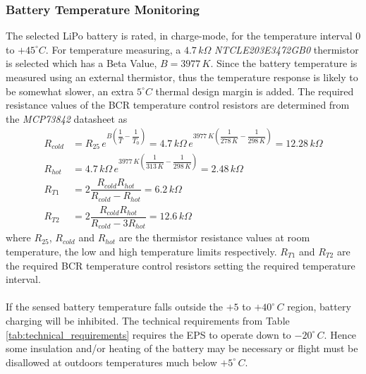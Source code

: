 \subsubsection{Battery Temperature Monitoring}
The selected \ac{LiPo} battery is rated, in charge-mode, for the temperature interval $0$ to $+45^{\circ}C$. For temperature measuring, a $4.7\,k \Omega$ \textit{NTCLE203E3472GB0} thermistor is selected which has a Beta Value, $B=3977\,K$. Since the battery temperature is measured using an external thermistor, thus the temperature response is likely to be somewhat slower, an extra $5^{\circ}C$ thermal design margin is added. The required resistance values of the \ac{BCR} temperature control resistors are determined from the \textit{MCP73842} datasheet as 
%
\begin{equation}
\begin{split}
R_{cold}&=R_{25}\,e^{B(\dfrac{1}{T}-\dfrac{1}{T_0})}=4.7\,k\Omega \,e^{3977\,K(\dfrac{1}{278	\,K}-\dfrac{1}{298\,K})}=12.28\,k\Omega\\
R_{hot}&=4.7\,k\Omega \, e^{3977\,K(\dfrac{1}{313	\,K}-\dfrac{1}{298\,K})}=2.48\,k\Omega\\
R_{T1}&=2\dfrac{R_{cold}R_{hot}}{R_{cold}-R_{hot}}=6.2\,k\Omega\\
R_{T2}&=2\dfrac{R_{cold}R_{hot}}{R_{cold}-3R_{hot}}=12.6\,k\Omega
\end{split}
\end{equation}
%
where $R_{25}$, $R_{cold}$ and $R_{hot}$ are the thermistor resistance values at room temperature, the low and high temperature limits respectively. $R_{T1}$ and $R_{T2}$ are the required \ac{BCR} temperature control resistors setting the required temperature interval.
\\
\\
If the sensed battery temperature falls outside the $+5$ to $+40^{\circ}\,C$ region, battery charging will be inhibited. The technical requirements from Table \ref{tab:technical_requirements} requires the \ac{EPS} to operate down to $-20^{\circ}\,C$. Hence some insulation and/or heating of the battery may be necessary or flight must be disallowed at outdoors temperatures much below $+5^{\circ}\,C$.
%
